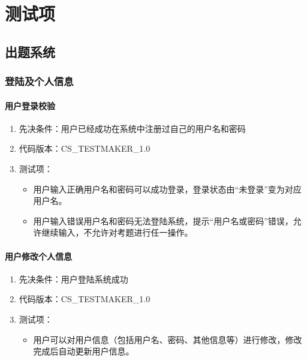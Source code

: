\documentclass[hyperref, a4paper]{ctexart}
\providecommand{\tightlist}{%
  \setlength{\itemsep}{0pt}\setlength{\parskip}{0pt}}
\let\oldparagraph\paragraph
\renewcommand{\paragraph}[1]{\oldparagraph{#1}\mbox{}}
\begin{document}
\hypertarget{ux6d4bux8bd5ux9879}{%
\section{测试项}\label{ux6d4bux8bd5ux9879}}

\hypertarget{ux51faux9898ux7cfbux7edf}{%
\subsection{出题系统}\label{ux51faux9898ux7cfbux7edf}}

\hypertarget{ux767bux9646ux53caux4e2aux4ebaux4fe1ux606f}{%
\subsubsection{登陆及个人信息}\label{ux767bux9646ux53caux4e2aux4ebaux4fe1ux606f}}

\hypertarget{ux7528ux6237ux767bux5f55ux6821ux9a8c}{%
\paragraph{用户登录校验}\label{ux7528ux6237ux767bux5f55ux6821ux9a8c}}

\begin{enumerate}
\def\labelenumi{\arabic{enumi}.}
\tightlist
\item
  先决条件：用户已经成功在系统中注册过自己的用户名和密码
\item
  代码版本：CS\_TESTMAKER\_1.0
\item
  测试项：

  \begin{itemize}
  \tightlist
  \item
    用户输入正确用户名和密码可以成功登录，登录状态由``未登录''变为对应用户名。
  \item
    用户输入错误用户名和密码无法登陆系统，提示``用户名或密码''错误，允许继续输入，不允许对考题进行任一操作。
  \end{itemize}
\end{enumerate}

\hypertarget{ux7528ux6237ux4feeux6539ux4e2aux4ebaux4fe1ux606f}{%
\paragraph{用户修改个人信息}\label{ux7528ux6237ux4feeux6539ux4e2aux4ebaux4fe1ux606f}}

\begin{enumerate}
\def\labelenumi{\arabic{enumi}.}
\tightlist
\item
  先决条件：用户登陆系统成功
\item
  代码版本：CS\_TESTMAKER\_1.0
\item
  测试项：

  \begin{itemize}
  \tightlist
  \item
    用户可以对用户信息（包括用户名、密码、其他信息等）进行修改，修改完成后自动更新用户信息。
  \end{itemize}
\end{enumerate}
\end{document}
